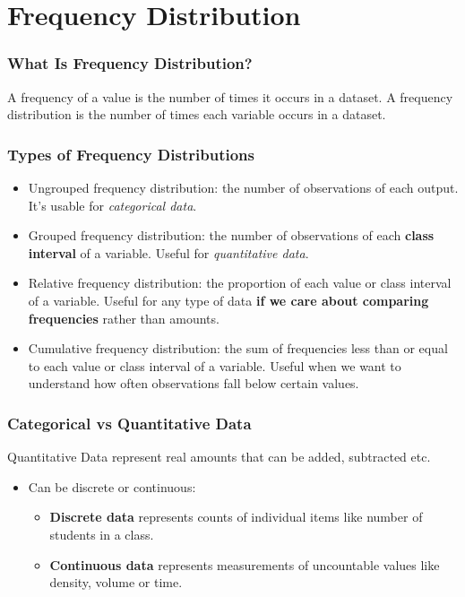 \documentclass[aspectratio=169,11pt,svgnames,handout]{beamer}
\begin{document}
\section{Frequency Distribution}

\begin{frame}
 \frametitle{What Is Frequency Distribution?}
 \begin{tcolorbox}[title=Frequency Distribution]
  A \alert{frequency} of a value is the number of times it occurs in a dataset.
  A \alert{frequency distribution} is the number of times each variable occurs
  in a dataset.
 \end{tcolorbox}
\end{frame}

\begin{frame}
 \frametitle{Types of Frequency Distributions}
 \begin{itemize}[label=\textbullet]
  \item \alert{Ungrouped frequency distribution}: the number of observations of
   each output. It's usable for \emph{categorical data}.
  \pause
  \item \alert{Grouped frequency distribution}: the number of observations of
   each \textbf{class interval} of a variable. Useful for \emph{quantitative
   data}.
  \pause
  \item \alert{Relative frequency distribution}: the proportion of each value or
   class interval of a variable. Useful for any type of data \textbf{if we care
   about comparing frequencies} rather than amounts.
  \pause
  \item \alert{Cumulative frequency distribution}: the sum of frequencies less
   than or equal to each value or class interval of a variable. Useful when we
   want to understand how often observations fall below certain values.
 \end{itemize}
\end{frame}

\begin{frame}
 \frametitle{Categorical vs Quantitative Data}
 \alert{Quantitative Data} represent real amounts that can be added, subtracted
 etc.
 \pause
 \begin{itemize}[label=\textbullet]
  \item Can be discrete or continuous:
  \pause
  \begin{itemize}[label=$\circ$]
   \item \textbf{Discrete data} represents counts of individual items like number of
    students in a class.
   \pause
   \item \textbf{Continuous data} represents measurements of uncountable values like
    density, volume or time.
  \end{itemize}
 \end{itemize}
\end{frame}
\end{document}
